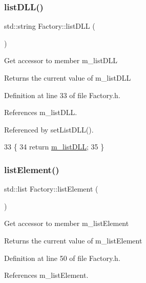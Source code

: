 \subsubsection{\texorpdfstring{list\+D\+L\+L()}{listDLL()}}
{\footnotesize\ttfamily std\+::string Factory\+::list\+D\+LL (\begin{DoxyParamCaption}{ }\end{DoxyParamCaption})\hspace{0.3cm}{\ttfamily [inline]}}

Get accessor to member m\+\_\+list\+D\+LL \begin{DoxyReturn}{Returns}
the current value of m\+\_\+list\+D\+LL 
\end{DoxyReturn}


Definition at line 33 of file Factory.\+h.



References m\+\_\+list\+D\+LL.



Referenced by set\+List\+D\+L\+L().


\begin{DoxyCode}
33                        \{
34     \textcolor{keywordflow}{return} \hyperlink{classFactory_a266167ae49fcf4fa9baa5485dea4b062}{m\_listDLL};
35   \}
\end{DoxyCode}
\mbox{\label{classFactory_aca9a1442c4ee2f17ea27db723ce65d90}} 
\subsubsection{\texorpdfstring{list\+Element()}{listElement()}}
{\footnotesize\ttfamily std\+::list Factory\+::list\+Element (\begin{DoxyParamCaption}{ }\end{DoxyParamCaption})\hspace{0.3cm}{\ttfamily [inline]}}

Get accessor to member m\+\_\+list\+Element \begin{DoxyReturn}{Returns}
the current value of m\+\_\+list\+Element 
\end{DoxyReturn}


Definition at line 50 of file Factory.\+h.



References m\+\_\+list\+Element.



